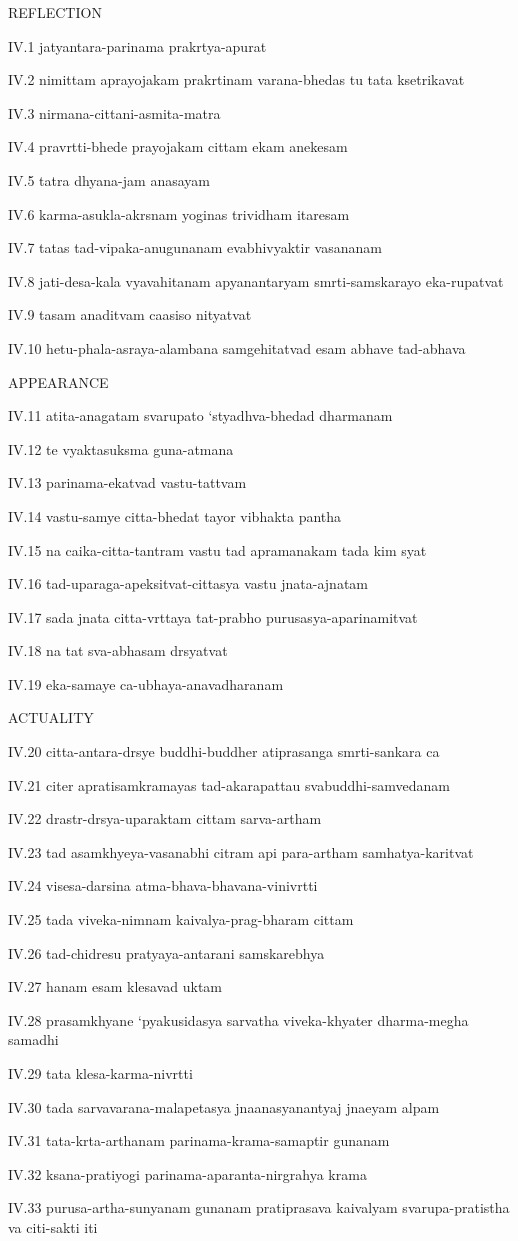 REFLECTION

IV.1
jatyantara-parinama prakrtya-apurat

IV.2
nimittam aprayojakam prakrtinam varana-bhedas tu tata ksetrikavat

IV.3
nirmana-cittani-asmita-matra

IV.4
pravrtti-bhede prayojakam cittam ekam anekesam

IV.5
tatra dhyana-jam anasayam

IV.6
karma-asukla-akrsnam yoginas trividham itaresam

IV.7
tatas tad-vipaka-anugunanam evabhivyaktir vasananam

IV.8
jati-desa-kala vyavahitanam apyanantaryam smrti-samskarayo eka-rupatvat

IV.9
tasam anaditvam caasiso nityatvat

IV.10
hetu-phala-asraya-alambana samgehitatvad esam abhave tad-abhava

APPEARANCE

IV.11
atita-anagatam svarupato ‘styadhva-bhedad dharmanam

IV.12
te vyaktasuksma guna-atmana

IV.13
parinama-ekatvad vastu-tattvam

IV.14
vastu-samye citta-bhedat tayor vibhakta pantha

IV.15
na caika-citta-tantram vastu tad apramanakam tada kim syat

IV.16
tad-uparaga-apeksitvat-cittasya vastu jnata-ajnatam

IV.17
sada jnata citta-vrttaya tat-prabho purusasya-aparinamitvat

IV.18
na tat sva-abhasam drsyatvat

IV.19
eka-samaye ca-ubhaya-anavadharanam

ACTUALITY

IV.20
citta-antara-drsye buddhi-buddher atiprasanga smrti-sankara ca

IV.21
citer apratisamkramayas tad-akarapattau svabuddhi-samvedanam

IV.22
drastr-drsya-uparaktam cittam sarva-artham

IV.23
tad asamkhyeya-vasanabhi citram api para-artham samhatya-karitvat

IV.24
visesa-darsina atma-bhava-bhavana-vinivrtti

IV.25
tada viveka-nimnam kaivalya-prag-bharam cittam

IV.26
tad-chidresu pratyaya-antarani samskarebhya

IV.27
hanam esam klesavad uktam

IV.28
prasamkhyane ‘pyakusidasya sarvatha viveka-khyater dharma-megha samadhi

IV.29
tata klesa-karma-nivrtti

IV.30
tada sarvavarana-malapetasya jnaanasyanantyaj jnaeyam alpam

IV.31
tata-krta-arthanam parinama-krama-samaptir gunanam

IV.32
ksana-pratiyogi parinama-aparanta-nirgrahya krama

IV.33
purusa-artha-sunyanam gunanam pratiprasava kaivalyam
svarupa-pratistha va citi-sakti iti
